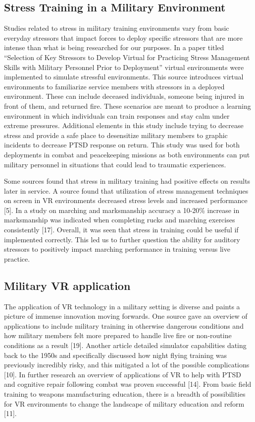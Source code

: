 \documentclass[manuscript,screen,review]{acmart}
\begin{document}
\subsection{Stress Training in a Military Environment}
Studies related to stress in military training environments vary from basic everyday stressors that 
impact forces to deploy specific stressors that are more intense than what is being researched for 
our purposes. In a paper titled “Selection of Key Stressors to Develop Virtual for Practicing Stress 
Management Skills with Military Personnel Prior to Deployment” virtual environments were implemented 
to simulate stressful environments. This source introduces virtual environments to familiarize service 
members with stressors in a deployed environment. These can include deceased individuals, someone being 
injured in front of them, and returned fire. These scenarios are meant to produce a learning environment 
in which individuals can train responses and stay calm under extreme pressures. Additional elements in 
this study include trying to decrease stress and provide a safe place to desensitize military members 
to graphic incidents to decrease PTSD response on return. This study was used for both deployments in 
combat and peacekeeping missions as both environments can put military personnel in situations that could 
lead to traumatic experiences.  

Some sources found that stress in military training had positive effects on results later in service. 
A source found that utilization of stress management techniques on screen in VR environments decreased 
stress levels and increased performance [5]. In a study on marching and marksmanship accuracy a 
10-20\% increase in marksmanship was indicated when completing rucks 
and marching exercises consistently [17]. Overall, it was seen that stress in training could be 
useful if implemented correctly. This led us to further question the ability for auditory stressors 
to positively impact marching performance in training versus live practice.  

\subsection{Military VR application}
The application of VR technology in a military setting is diverse and paints a picture of immense 
innovation moving forwards. One source gave an overview of applications to include military 
training in otherwise dangerous conditions and how military members felt more prepared to handle 
live fire or non-routine conditions as a result [19]. Another article detailed simulator capabilities 
dating back to the 1950s and specifically discussed how night flying training was previously incredibly 
risky, and this mitigated a lot of the possible complications [10]. In further research an overview 
of applications of VR to help with PTSD and cognitive repair following combat was proven successful 
[14]. From basic field training to weapons manufacturing education, there is a breadth of possibilities 
for VR environments to change the landscape of military education and reform [11].  
\end{document}
